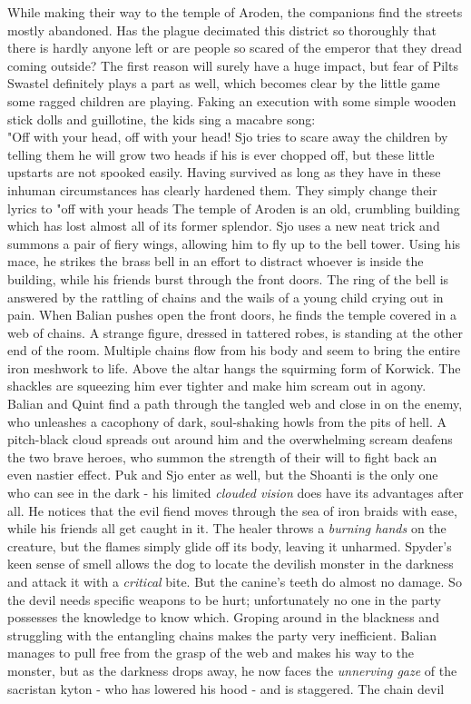 While making their way to the temple of Aroden, the companions find the streets mostly abandoned. Has the plague decimated this district so thoroughly that there is hardly anyone left or are people so scared of the emperor that they dread coming outside? The first reason will surely have a huge impact, but fear of Pilts Swastel definitely plays a part as well, which becomes clear by the little game some ragged children are playing. Faking an execution with some simple wooden stick dolls and guillotine, the kids sing a macabre song:\\

"Off with your head, off with your head!   Sjo tries to scare away the children by telling them he will grow two heads if his is ever chopped off, but these little upstarts are not spooked easily. Having survived as long as they have in these inhuman circumstances has clearly hardened them. They simply change their lyrics to "off with your heads The temple of Aroden is an old, crumbling building which has lost almost all of its former splendor. Sjo uses a new neat trick and summons a pair of fiery wings, allowing him to fly up to the bell tower. Using his mace, he strikes the brass bell in an effort to distract whoever is inside the building, while his friends burst through the front doors. The ring of the bell is answered by the rattling of chains and the wails of a young child crying out in pain. When Balian pushes open the front doors, he finds the temple covered in a web of chains. A strange figure, dressed in tattered robes, is standing at the other end of the room. Multiple chains flow from his body and seem to bring the entire iron meshwork to life. Above the altar hangs the squirming form of Korwick. The shackles are squeezing him ever tighter and make him scream out in agony. Balian and Quint find a path through the tangled web and close in on the enemy, who unleashes a cacophony of dark, soul-shaking howls from the pits of hell. A pitch-black cloud spreads out around him and the overwhelming scream deafens the two brave heroes, who summon the strength of their will to fight back an even nastier effect. Puk and Sjo enter as well, but the Shoanti is the only one who can see in the dark - his limited {\itshape clouded vision} does have its advantages after all. He notices that the evil fiend moves through the sea of iron braids with ease, while his friends all get caught in it. The healer throws a  {\itshape burning hands} on the creature, but the flames simply glide off its body, leaving it unharmed. Spyder's keen sense of smell allows the dog to locate the devilish monster in the darkness and attack it with a  {\itshape critical} bite. But the canine's teeth do almost no damage. So the devil needs specific weapons to be hurt; unfortunately no one in the party possesses the knowledge to know which. Groping around in the blackness and struggling with the entangling chains makes the party very inefficient. Balian manages to pull free from the grasp of the web and makes his way to the monster, but as the darkness drops away, he now faces the  {\itshape unnerving gaze} of the sacristan kyton - who has lowered his hood - and is staggered. The chain devil 